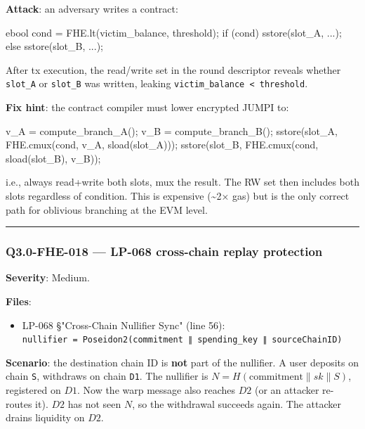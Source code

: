 \documentclass[
]{article}
\newenvironment{Shaded}{}{}
\newcommand{\NormalTok}[1]{#1}
\providecommand{\tightlist}{%
  \setlength{\itemsep}{0pt}\setlength{\parskip}{0pt}}
\begin{document}
\textbf{Attack}: an adversary writes a contract:

\begin{Shaded}
\begin{Highlighting}[]
\NormalTok{ebool cond = FHE.lt(victim\_balance, threshold);}
\NormalTok{if (cond) sstore(slot\_A, ...);}
\NormalTok{else      sstore(slot\_B, ...);}
\end{Highlighting}
\end{Shaded}

After tx execution, the read/write set in the round descriptor reveals
whether \texttt{slot\_A} or \texttt{slot\_B} was written, leaking
\texttt{victim\_balance\ \textless{}\ threshold}.

\textbf{Fix hint}: the contract compiler must lower encrypted JUMPI to:

\begin{Shaded}
\begin{Highlighting}[]
\NormalTok{v\_A = compute\_branch\_A();}
\NormalTok{v\_B = compute\_branch\_B();}
\NormalTok{sstore(slot\_A, FHE.cmux(cond, v\_A, sload(slot\_A)));}
\NormalTok{sstore(slot\_B, FHE.cmux(cond, sload(slot\_B), v\_B));}
\end{Highlighting}
\end{Shaded}

i.e., always read+write both slots, mux the result. The RW set then
includes both slots regardless of condition. This is expensive
(\textasciitilde2× gas) but is the only correct path for oblivious
branching at the EVM level.

\begin{center}\rule{0.5\linewidth}{0.5pt}\end{center}

\subsubsection{Q3.0-FHE-018 --- LP-068 cross-chain replay
protection}\label{q30-fhe-018--lp-068-cross-chain-replay-protection}

\textbf{Severity}: Medium.

\textbf{Files}:

\begin{itemize}
\tightlist
\item
  LP-068 §"Cross-Chain Nullifier Sync" (line 56):
  \texttt{nullifier\ =\ Poseidon2(commitment\ ∥\ spending\_key\ ∥\ sourceChainID)}
\end{itemize}

\textbf{Scenario}: the destination chain ID is \textbf{not} part of the
nullifier. A user deposits on chain \texttt{S}, withdraws on chain
\texttt{D1}. The nullifier is \(N = H(\text{commitment} \| sk \| S)\),
registered on \(D1\). Now the warp message also reaches \(D2\) (or an
attacker re-routes it). \(D2\) has not seen \(N\), so the withdrawal
succeeds again. The attacker drains liquidity on \(D2\).
\end{document}
